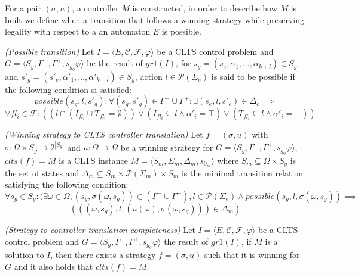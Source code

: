 For a pair $(\sigma,u)$, a controller $M$ is constructed, in order to describe how $M$ is built we define when a transition that follows a winning strategy while preserving legality with respect to a an automaton $E$ is possible.

\begin{definition}\label{def:strat_possible_transition} \emph{(Possible transition)} 
	Let $I = \langle E, \mathcal{C}, \mathcal{F}, \varphi \rangle$ be a CLTS control problem and $G = \langle S_g, \Gamma^-,\Gamma^+,s_{g_0}\varphi \rangle$ be the result of $gr1(I)$, for $s_g=(s_e,\alpha_1,\ldots,\alpha_{k+l}) \in S_g$ and $s'_g=(s'_e,\alpha'_1,\ldots,\alpha'_{k+l}) \in S_g$, action $l \in \mathcal{P}(\Sigma_e)$ is said to be possible if the following condition si satisfied:
	\[possible(s_g,l,s'_g):\forall (s_g,s'_g) \in \Gamma^- \cup \Gamma^+: \exists (s_e,l,s'_e) \in \Delta_e \implies \]
	\[ \forall fl_i \in \mathcal{F}: ((l \cap (I_{fl_i} \cup T_{fl_i} = \emptyset)) \vee (I_{fl_i} \subseteq l \wedge \alpha'_i = \top)\vee (T_{fl_i} \subseteq l \wedge \alpha'_i = \bot))\]
\end{definition}

\begin{definition}\label{def:strat_to_clts_translation} \emph{(Winning strategy to CLTS controller translation)} 
	Let $f=(\sigma,u)$ with $\sigma:\Omega \times S_g \rightarrow 2^{|S_g|}$ and
	$u:\Omega \rightarrow \Omega$ be a winning strategy for $G = \langle S_g, \Gamma^-,\Gamma^+,s_{g_0}\varphi \rangle$, $clts(f)=M$ is a CLTS instance $M=\langle S_m, \Sigma_m, \Delta_m, s_{0_m}\rangle$ where $S_m \subseteq \Omega \times S_g$ is the set of states
	and $\Delta_m \subseteq S_m \times \mathcal{P}(\Sigma_m) \times S_m$ is the minimal transition relation satisfying the following condition:
	\[\forall s_g \in S_g: (\exists \omega \in \Omega, (s_g,\sigma(\omega,s_g)) \in (\Gamma^- \cup \Gamma^+), l \in \mathcal{P}(\Sigma_e) \wedge possible(s_g,l,\sigma(\omega,s_g)) \implies \] \[(((\omega,s_g),l,(u(\omega),\sigma(\omega,s_g)))\in \Delta_m) \]
\end{definition}

\begin{definition}\label{def:strat_completeness} \emph{(Strategy to controller translation completeness)} 
	Let $I = \langle E, \mathcal{C}, \mathcal{F}, \varphi \rangle$ be a CLTS control problem and $G = \langle S_g, \Gamma^-,\Gamma^+,s_{g_0}\varphi \rangle$ the result of $gr1(I)$, if $M$ is a solution to $I$, then there exists a strategy $f=(\sigma, u)$ such that it is winning for $G$ and it also holds that $clts(f) = M$.
\end{definition}

